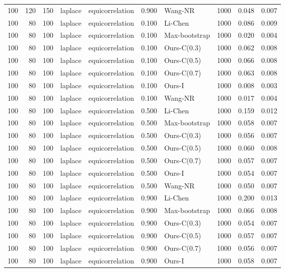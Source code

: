 \begin{tabular}{rrrllrlrrr}
100 & 120 & 150 & laplace & equicorrelation & 0.900 & Wang-NR & 1000 & 0.048 & 0.007 \\
100 & 80 & 100 & laplace & equicorrelation & 0.100 & Li-Chen & 1000 & 0.086 & 0.009 \\
100 & 80 & 100 & laplace & equicorrelation & 0.100 & Max-bootstrap & 1000 & 0.020 & 0.004 \\
100 & 80 & 100 & laplace & equicorrelation & 0.100 & Ours-C(0.3) & 1000 & 0.062 & 0.008 \\
100 & 80 & 100 & laplace & equicorrelation & 0.100 & Ours-C(0.5) & 1000 & 0.066 & 0.008 \\
100 & 80 & 100 & laplace & equicorrelation & 0.100 & Ours-C(0.7) & 1000 & 0.063 & 0.008 \\
100 & 80 & 100 & laplace & equicorrelation & 0.100 & Ours-I & 1000 & 0.008 & 0.003 \\
100 & 80 & 100 & laplace & equicorrelation & 0.100 & Wang-NR & 1000 & 0.017 & 0.004 \\
100 & 80 & 100 & laplace & equicorrelation & 0.500 & Li-Chen & 1000 & 0.159 & 0.012 \\
100 & 80 & 100 & laplace & equicorrelation & 0.500 & Max-bootstrap & 1000 & 0.058 & 0.007 \\
100 & 80 & 100 & laplace & equicorrelation & 0.500 & Ours-C(0.3) & 1000 & 0.056 & 0.007 \\
100 & 80 & 100 & laplace & equicorrelation & 0.500 & Ours-C(0.5) & 1000 & 0.060 & 0.008 \\
100 & 80 & 100 & laplace & equicorrelation & 0.500 & Ours-C(0.7) & 1000 & 0.057 & 0.007 \\
100 & 80 & 100 & laplace & equicorrelation & 0.500 & Ours-I & 1000 & 0.054 & 0.007 \\
100 & 80 & 100 & laplace & equicorrelation & 0.500 & Wang-NR & 1000 & 0.050 & 0.007 \\
100 & 80 & 100 & laplace & equicorrelation & 0.900 & Li-Chen & 1000 & 0.200 & 0.013 \\
100 & 80 & 100 & laplace & equicorrelation & 0.900 & Max-bootstrap & 1000 & 0.066 & 0.008 \\
100 & 80 & 100 & laplace & equicorrelation & 0.900 & Ours-C(0.3) & 1000 & 0.054 & 0.007 \\
100 & 80 & 100 & laplace & equicorrelation & 0.900 & Ours-C(0.5) & 1000 & 0.057 & 0.007 \\
100 & 80 & 100 & laplace & equicorrelation & 0.900 & Ours-C(0.7) & 1000 & 0.056 & 0.007 \\
100 & 80 & 100 & laplace & equicorrelation & 0.900 & Ours-I & 1000 & 0.058 & 0.007 \\

\end{tabular}

